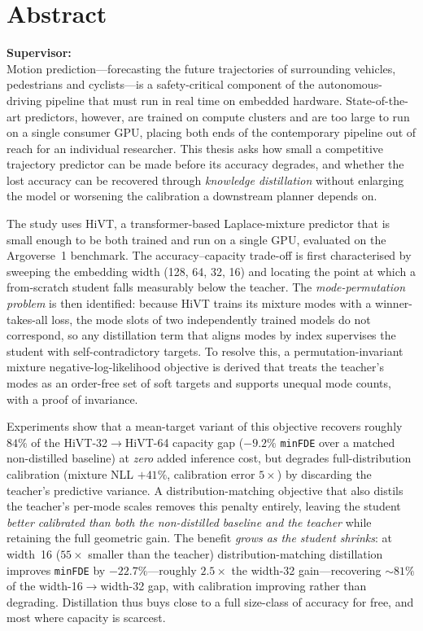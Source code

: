 \chapter*{Abstract}

\begin{center}\bfseries \ThesisTitleEN\end{center}
\noindent\textbf{\StudentEN} \hfill \textbf{Supervisor: \SupervisorEN}\\[10pt]

Motion prediction---forecasting the future trajectories of surrounding vehicles,
pedestrians and cyclists---is a safety-critical component of the autonomous-driving
pipeline that must run in real time on embedded hardware. State-of-the-art
predictors, however, are trained on compute clusters and are too large to run on a
single consumer GPU, placing both ends of the contemporary pipeline out of reach
for an individual researcher. This thesis asks how small a competitive trajectory
predictor can be made before its accuracy degrades, and whether the lost accuracy
can be recovered through \emph{knowledge distillation} without enlarging the model
or worsening the calibration a downstream planner depends on.

The study uses HiVT, a transformer-based Laplace-mixture predictor that is small
enough to be both trained and run on a single GPU, evaluated on the Argoverse~1
benchmark. The accuracy--capacity trade-off is first characterised by sweeping the
embedding width (128, 64, 32, 16) and locating the point at which a from-scratch
student falls measurably below the teacher. The
\emph{mode-permutation problem} is then identified: because HiVT trains its mixture modes with a
winner-takes-all loss, the mode slots of two independently trained models do not
correspond, so any distillation term that aligns modes by index supervises the
student with self-contradictory targets. To resolve this, a
permutation-invariant mixture negative-log-likelihood objective is derived that treats the
teacher's modes as an order-free set of soft targets and supports unequal mode
counts, with a proof of invariance.

Experiments show that a mean-target variant of this objective recovers roughly
$84\%$ of the HiVT-32$\to$HiVT-64 capacity gap ($-9.2\%$ \texttt{minFDE} over a
matched non-distilled baseline) at \emph{zero} added inference cost, but degrades
full-distribution calibration (mixture NLL $+41\%$, calibration error $5\times$) by
discarding the teacher's predictive variance. A distribution-matching objective
that also distils the teacher's per-mode scales removes this penalty entirely,
leaving the student \emph{better calibrated than both the non-distilled baseline
and the teacher} while retaining the full geometric gain. The benefit \emph{grows
as the student shrinks}: at width~16 ($55\times$ smaller than the teacher)
distribution-matching distillation improves \texttt{minFDE} by
$-22.7\%$---roughly $2.5\times$ the width-32 gain---recovering $\sim\!81\%$ of the
width-16$\to$width-32 gap, with calibration improving rather than degrading.
Distillation thus buys close to a full size-class of accuracy for free, and most
where capacity is scarcest.

